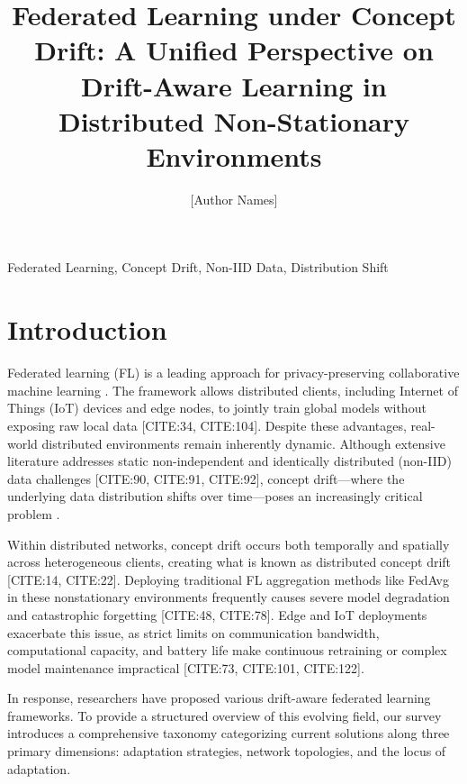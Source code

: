 \documentclass[journal]{IEEEtran}
\title{Federated Learning under Concept Drift: A Unified Perspective on Drift-Aware Learning in Distributed Non-Stationary Environments}
\author{[Author Names]}
\begin{document}
\maketitle

\begin{abstract}
\end{abstract}

\begin{IEEEkeywords}Federated Learning, Concept Drift, Non-IID Data, Distribution Shift\end{IEEEkeywords}

\section{Introduction}
\label{sec:introduction}

Federated learning (FL) is a leading approach for privacy-preserving collaborative machine learning \cite{Collins2025}. The framework allows distributed clients, including Internet of Things (IoT) devices and edge nodes, to jointly train global models without exposing raw local data [CITE:34, CITE:104]. Despite these advantages, real-world distributed environments remain inherently dynamic. Although extensive literature addresses static non-independent and identically distributed (non-IID) data challenges [CITE:90, CITE:91, CITE:92], concept drift—where the underlying data distribution shifts over time—poses an increasingly critical problem \cite{Martin2025}. 

Within distributed networks, concept drift occurs both temporally and spatially across heterogeneous clients, creating what is known as distributed concept drift [CITE:14, CITE:22]. Deploying traditional FL aggregation methods like FedAvg in these nonstationary environments frequently causes severe model degradation and catastrophic forgetting [CITE:48, CITE:78]. Edge and IoT deployments exacerbate this issue, as strict limits on communication bandwidth, computational capacity, and battery life make continuous retraining or complex model maintenance impractical [CITE:73, CITE:101, CITE:122].

In response, researchers have proposed various drift-aware federated learning frameworks. To provide a structured overview of this evolving field, our survey introduces a comprehensive taxonomy categorizing current solutions along three primary dimensions: adaptation strategies, network topologies, and the locus of adaptation. 
\end{document}
